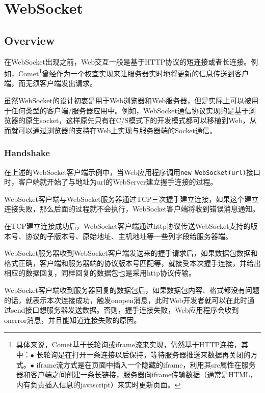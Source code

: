 \part{WebSocket}



\chapter{Overview}

在WebSocket出现之前，Web交互一般是基于HTTP协议的短连接或者长连接。例如，Comet\footnote{具体来说，Comet基于长轮询或iframe流来实现，仍然基于HTTP连接，其中：\newline $\bullet$ 长轮询是在打开一条连接以后保持，等待服务器推送来数据再关闭的方式。\newline $\bullet$ iframe流方式是在页面中插入一个隐藏的iframe，利用其src属性在服务器和客户端之间创建一条长链接，服务器向iframe传输数据（通常是HTML，内有负责插入信息的javascript）来实时更新页面。}曾经作为一个权宜实现来让服务器实时地将更新的信息传送到客户端，而无须客户端发出请求。



虽然WebSocket的设计初衷是用于Web浏览器和Web服务器，但是实际上可以被用于任何类型的客户端/服务器应用中。例如，WebSocket通信协议实现的是基于浏览器的原生socket，这样原先只有在C/S模式下的开发模式都可以移植到Web，从而就可以通过浏览器的支持在Web上实现与服务器端的Socket通信。


\section{Handshake}

在上述的WebSocket客户端示例中，当Web应用程序调用\texttt{new WebSocket(url)}接口时，客户端就开始了与地址为url的WebServer建立握手连接的过程。


\begin{compactenum}
\item WebSocket客户端与WebSocket服务器通过TCP三次握手建立连接，如果这个建立连接失败，那么后面的过程就不会执行，WebSocket客户端将收到错误消息通知。

\item 在TCP建立连接成功后，WebSocket客户端通过http协议传送WebSocket支持的版本号、协议的子版本号、原始地址、主机地址等一些列字段给服务器端。

\item WebSocket服务器收到WebSocket客户端发送来的握手请求后，如果数据包数据和格式正确，客户端和服务器端的协议版本号匹配等，就接受本次握手连接，并给出相应的数据回复，同样回复的数据包也是采用http协议传输。

\item WebSocket客户端收到服务器回复的数据包后，如果数据包内容、格式都没有问题的话，就表示本次连接成功，触发onopen消息，此时Web开发者就可以在此时通过send接口想服务器发送数据。否则，握手连接失败，Web应用程序会收到onerror消息，并且能知道连接失败的原因。


\end{compactenum}



